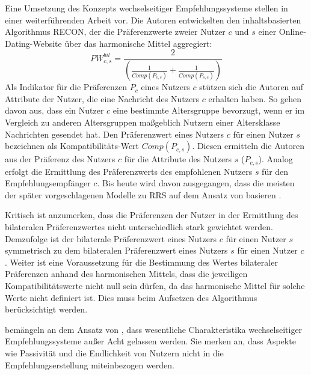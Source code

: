 Eine Umsetzung des Konzepts wechselseitiger Empfehlungssysteme stellen \textcite[S. 207ff.]{pizzato:2010} in einer weiterführenden Arbeit vor.
Die Autoren entwickelten den inhaltsbasierten Algorithmus RECON, der die Präferenzwerte zweier Nutzer $c$ und $s$ einer Online-Dating-Website über das harmonische Mittel aggregiert:
\begin{equation}\label{eq33}
    PW_{c,s}^{bil} = \frac{2}{(\frac{1}{Comp(P_{c,s})}+\frac{1}{Comp(P_{s,c})})}
\end{equation}
Als Indikator für die Präferenzen $P_{c}$ eines Nutzers $c$ stützen sich die Autoren auf Attribute der Nutzer, die eine Nachricht des Nutzers $c$ erhalten haben.
So gehen \textcite[S. 210]{pizzato:2010} davon aus, dass ein Nutzer $c$ eine bestimmte Altersgruppe bevorzugt, wenn er im Vergleich zu anderen Altersgruppen maßgeblich Nutzern einer Altersklasse Nachrichten gesendet hat.
Den Präferenzwert eines Nutzers $c$ für einen Nutzer $s$ bezeichnen \textcite[S. 210]{pizzato:2010} als Kompatibilitäts-Wert $Comp(P_{c,s})$.
Diesen ermitteln die Autoren aus der Präferenz des Nutzers $c$ für die Attribute des Nutzers $s$ ($P_{c,s}$).
Analog erfolgt die Ermittlung des Präferenzwerts des empfohlenen Nutzers $s$ für den Empfehlungsempfänger $c$.
Bis heute wird davon ausgegangen, dass die meisten der später vorgeschlagenen Modelle zu \ac{RRS} auf dem Ansatz von \textcite[S. 207ff.]{pizzato:2010} basieren \cite[S. 723]{kumari:article}.

Kritisch ist anzumerken, dass die Präferenzen der Nutzer in der Ermittlung des bilateralen Präferenzwertes nicht unterschiedlich stark gewichtet werden.
Demzufolge ist der bilaterale Präferenzwert eines Nutzers $c$ für einen Nutzer $s$ symmetrisch zu dem bilateralen Präferenzwert eines Nutzers $s$ für einen Nutzer $c$ \cite[S. 211]{pizzato:2010}.
Weiter ist eine Voraussetzung für die Bestimmung des Wertes bilateraler Präferenzen anhand des harmonischen Mittels, dass die jeweiligen Kompatibilitätswerte nicht null sein dürfen, da das harmonische Mittel für solche Werte nicht definiert ist.
Dies muss beim Aufsetzen des Algorithmus berücksichtigt werden.

\textcite[S. 40]{li:inproceedings} bemängeln an dem Ansatz von \textcite[S. 207ff.]{pizzato:2010}, dass wesentliche Charakteristika wechselseitiger Empfehlungssysteme außer Acht gelassen werden.
Sie merken an, dass Aspekte wie Passivität und die Endlichkeit von Nutzern nicht in die Empfehlungserstellung miteinbezogen werden.

